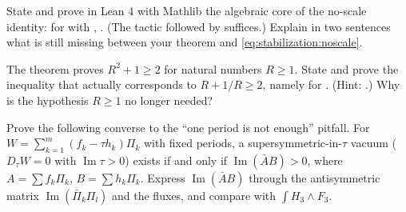 \begin{exercise}\label{ex:stabilization:leannoscale}
State and prove in Lean 4 with Mathlib the algebraic core of the no-scale identity:
for  with , . (The tactic
 followed by  suffices.) Explain in two sentences what is still
missing between your theorem and \eqref{eq:stabilization:noscale}.
\end{exercise}

\begin{exercise}
The theorem  proves $R^2+1\ge2$ for natural numbers
$R\ge1$. State and prove the inequality that actually corresponds to $R+1/R\ge2$, namely
 for . (Hint: .)
Why is the hypothesis $R\ge1$ no longer needed?
\end{exercise}

\begin{exercise}[$\star\star\star$]
Prove the following converse to the ``one period is not enough'' pitfall. For
$W=\sum_{k=1}^m(f_k-\tau h_k)\Pi_k$ with fixed periods, a supersymmetric-in-$\tau$ vacuum
($D_\tau W=0$ with $\operatorname{Im}\tau>0$) exists if and only if
$\operatorname{Im}(\bar AB)>0$, where $A=\sum f_k\Pi_k$, $B=\sum h_k\Pi_k$. Express
$\operatorname{Im}(\bar AB)$ through the antisymmetric matrix
$\operatorname{Im}(\bar\Pi_k\Pi_l)$ and the fluxes, and compare with $\int H_3\wedge F_3$.
\end{exercise}

